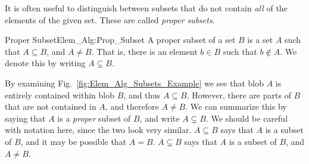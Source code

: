 \documentclass[crop=false,class=book,oneside]{standalone}
\begin{document}
            It is often useful to distinguish between subsets
            that do not contain \textit{all} of the elements of
            the given set. These are called \textit{proper subsets}.
            \begin{ldefinition}{Proper Subset}{Elem_Alg:Prop_Subset}
                A proper subset of a set $B$ is a set $A$ such that
                $A\subseteq{B}$, and $A\ne{B}$. That is, there is
                an element $b\in{B}$ such that $b\notin{A}$. We
                denote this by writing $A\subsetneq{B}$.
            \end{ldefinition}
            By examining Fig.~\ref{fig:Elem_Alg_Subsets_Example}
            we see that blob $A$ is entirely
            contained within blob $B$, and thus
            $A\subseteq{B}$. However, there are parts of $B$
            that are not contained in $A$, and
            therefore $A\ne{B}$. We can summarize this by
            saying that $A$ is a \textit{proper} subset of
            $B$, and write $A\subsetneq{B}$.
            We should be careful with notation here, since the
            two look very similar. $A\subseteq{B}$ says that
            $A$ is a subset of $B$, and it may be possible that
            $A=B$. $A\subsetneq{B}$ says that $A$ is a subset of
            $B$, and $A\ne{B}$.
\end{document}
